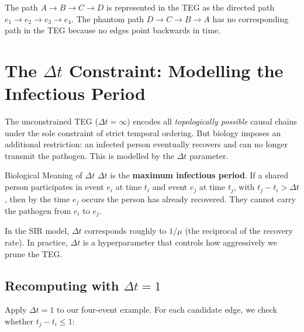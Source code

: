 The path $A \to B \to C \to D$ is represented in the TEG as the directed path
$e_1 \to e_2 \to e_3 \to e_4$. The phantom path $D \to C \to B \to A$ has no
corresponding path in the TEG because no edges point backwards in time.

\section{The $\Delta t$ Constraint: Modelling the Infectious Period}
\label{sec:teg_delta_t}

The unconstrained TEG ($\Delta t = \infty$) encodes all \emph{topologically
possible} causal chains under the sole constraint of strict temporal ordering.
But biology imposes an additional restriction: an infected person eventually
recovers and can no longer transmit the pathogen. This is modelled by the
$\Delta t$ parameter.

\begin{conceptbox}{Biological Meaning of $\Delta t$}
$\Delta t$ is the \textbf{maximum infectious period}. If a shared person
participates in event $e_i$ at time $t_i$ and event $e_j$ at time $t_j$, with
$t_j - t_i > \Delta t$, then by the time $e_j$ occurs the person has already
recovered. They cannot carry the pathogen from $e_i$ to $e_j$.

In the SIR model, $\Delta t$ corresponds roughly to $1/\mu$ (the reciprocal
of the recovery rate). In practice, $\Delta t$ is a hyperparameter that
controls how aggressively we prune the TEG.
\end{conceptbox}

\subsection{Recomputing with $\Delta t = 1$}

Apply $\Delta t = 1$ to our four-event example. For each candidate edge, we
check whether $t_j - t_i \le 1$:

